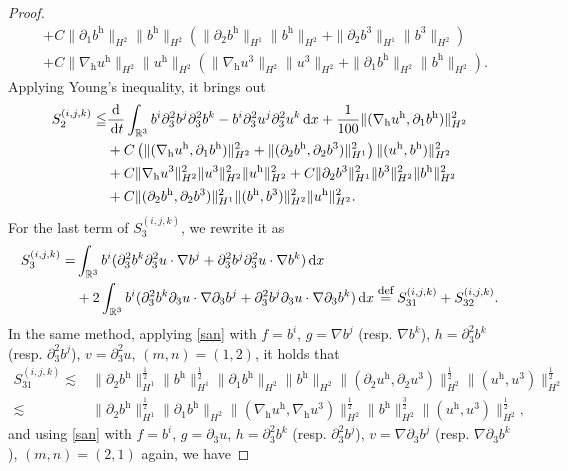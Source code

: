 \documentclass[11pt]{amsart}
\theoremstyle{definition}
\newcommand{\R}{\mathbb{R}}
\newcommand{\h}{\mathrm{h}}
\def\eqdefa{\buildrel\hbox{\footnotesize def}\over =}
\newcommand{\dx}{\,{\rm d}x}
\newcommand{\dt}{\,{\rm d}t}
\newcommand{\nablah}{\nabla_{\mathrm{h}}}
\numberwithin{equation}{section}
\begin{document}
\begin{proof}
\begin{align*}
		&+C\|\partial_1b^\h\|_{H^2}\|b^\h\|_{H^2}\left(\|\partial_2b^\h\|_{H^1}\|b^\h\|_{H^2}+\|\partial_2b^3\|_{H^1}\|b^3\|_{H^2}\right)\nonumber\\
		&+ C\|\nablah u^\h\|_{H^2}\|u^\h\|_{H^2}\left(\|\nablah u^3\|_{H^2}\|u^3\|_{H^2}+\|\partial_1b^\h\|_{H^2}\| b^\h\|_{H^2}\right).
	\end{align*}
	Applying Young's inequality, it brings out
	\begin{align}\label{S2}
		S^{(i,j,k)}_{2}\leqq &\frac{\mathrm{d}}{\dt}\int_{\R^3} b^i\partial_3^2b^j\partial_3^2b^k-b^i\partial_3^2u^j\partial_3^2u^k\dx+\frac{1}{100}\|(\nablah u^\h,\partial_1b^\h)\|_{H^2}^2\nonumber\\
		&+C\left(\|(\nablah u^\h,\partial_1b^\h)\|_{H^2}^2+\|(\partial_2b^\h,\partial_2b^3)\|_{H^1}^2\right)\|(u^\h,b^\h)\|_{H^2}^2\nonumber\\
		&+C\|\nablah u^3\|_{H^2}^2\|u^3\|_{H^2}^2 \|u^\h\|_{H^2}^2+C\|\partial_2b^3\|_{H^1}^2\|b^3\|_{H^2}^2\|b^\h\|_{H^2}^2\nonumber\\
		&+C\|(\partial_2b^\h,\partial_2b^3)\|_{H^1}^2\|(b^\h,b^3)\|_{H^2}^2\|u^\h\|_{H^2}^2.
	\end{align}
	For the last term of $S^{(i,j,k)}_{3}$, we rewrite it as
	\begin{align*}
		S^{(i,j,k)}_{3}=&\int_{\R^3} b^i (\partial_3^2b^k\partial_3^2u\cdot\nabla{b}^j+\partial_3^2b^j\partial_3^2u\cdot\nabla{b}^k)\dx\\
		&+2\int_{\R^3}b^i(\partial_3^2b^k\partial_3u\cdot\nabla\partial_3{b}^j+\partial_3^2b^j\partial_3u\cdot\nabla\partial_3{b}^k)\dx
		\eqdefa S^{(i,j,k)}_{31}+S^{(i,j,k)}_{32}.
	\end{align*}
	In the same method, applying \eqref{san} with $f=b^i$, $g=\nabla b^j$ (resp. $\nabla b^k$), $h=\partial_3^2b^k$ (resp. $\partial_3^2b^j$), $v=\partial_3^2u$, $(m,n)=(1,2)$, it holds that
	\begin{align*}
		S^{(i,j,k)}_{31}\lesssim&\|\partial_2b^\h\|_{H^1}^\frac12\|b^\h\|_{H^1}^\frac12\|\partial_1b^\h\|_{H^2}\|b^\h\|_{H^2}\|(\partial_2u^\h,\partial_2u^3)\|_{H^2}^\frac12\|(u^\h,u^3)\|_{H^2}^\frac12\\
		\lesssim&\|\partial_2b^\h\|_{H^1}^\frac12\|\partial_1b^\h\|_{H^2}\|(\nablah u^\h,\nablah u^3)\|_{H^2}^\frac12\|b^\h\|_{H^2}^\frac32\|(u^\h,u^3)\|_{H^2}^\frac12,
	\end{align*}
	and using \eqref{san} with $f=b^i$, $g=\partial_3u$, $h=\partial_3^2b^k$ (resp. $\partial_3^2b^j$), $v=\nabla\partial_3{b}^j$ (resp. $\nabla\partial_3{b}^k$), $(m,n)=(2,1)$ again, we have

\end{proof}
\end{document}

